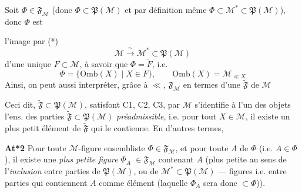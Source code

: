 \documentclass[11pt,a4paper]{article}
\begin{document}
\struck{\ill{}} Soit $\Phi \in \mathfrak{F}_{\mathcal{M}}$ (donc $\Phi \subset \mathfrak{P}(\mathcal{M})$ et par définition même $\Phi \subset \mathcal{M}^{*} \subset \mathfrak{P}(\mathcal{M})$), donc $\Phi$ est

l'image par  (*)
\[
  \mathcal{M} \xrightarrow{\ \sim\ } \mathcal{M}^{*} \subset \mathfrak{P}(\mathcal{M})
\]
d'une unique  $F \subset \mathcal{M}$, à savoir que $\Phi = \widetilde{F}$, i.e.
\[
  \Phi = \lbrace \mathrm{Omb}(X) \mid X \in F \rbrace, \qquad \mathrm{Omb}(X) = \mathcal{M}_{\ll X}
\]
Ainsi, on peut aussi interpréter, grâce à $\ll$, $\mathfrak{F}_{\mathcal{M}}$ en termes d'une   $\widetilde{\mathfrak{F}}$ de $\mathcal{M}$



Ceci dit,   $\widetilde{\mathfrak{F}} \subset \mathfrak{P}(\mathcal{M})$,  \ill{} satisfont C1, C2, C3,  \ill{} par $\mathcal{M}$ s'identifie à l'un des \ill{} objets \add{\ill{}} \struck{\ill{}} l'ens. des parties $\widetilde{\mathfrak{F}} \subset \mathfrak{P}(\mathcal{M})$   \emph{préadmissible}, i.e. pour tout $X \in \mathcal{M}$, il existe un plus petit élément de $\widetilde{\mathfrak{F}}$ qui le contienne. En d'autres termes,


\textbf{At*2} Pour toute  $\mathcal{M}$-figure ensembliste $\Phi \in \mathfrak{F}_{\mathcal{M}}$, et pour toute  $A$ \add{$[= \mathrm{Omb}(X)\,!]$} de $\Phi$ (i.e. $A \in \Phi$), il existe une \emph{plus petite figure} $\Phi_A$ \struck{\ill{}} $\in \mathfrak{F}_{\mathcal{M}}$ contenant $A$ (plus petite au sens de l'\emph{inclusion} entre parties de $\mathfrak{P}(\mathcal{M})$, ou de $\mathcal{M}^{*} \subset \mathfrak{P}(\mathcal{M})$ --- figures i.e. entre parties qui contiennent $A$ comme élément (laquelle $\Phi_A$ sera donc $\subset \Phi$)).
\end{document}
